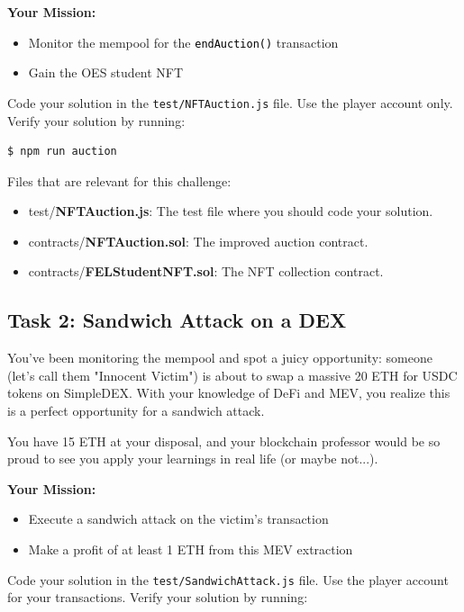 \documentclass[12pt]{article}
\newcommand{\codegrey}[1]{%
  \texttt{\colorbox{black!4}{\textcolor{black}{#1}}}%
}
\begin{document}
\medskip
\noindent
\textbf{Your Mission:}
\begin{itemize}
    \item Monitor the mempool for the \codegrey{endAuction()} transaction
    \item Gain the OES student NFT
\end{itemize}

\noindent
Code your solution in the \texttt{test/NFTAuction.js} file. Use the player account only. Verify your solution by running:

\begin{verbatim}
$ npm run auction
\end{verbatim}

\noindent
Files that are relevant for this challenge:
\begin{itemize}
\item test/\textbf{NFTAuction.js}: The test file where you should code your solution.
\item contracts/\textbf{NFTAuction.sol}: The improved auction contract.
\item contracts/\textbf{FELStudentNFT.sol}: The NFT collection contract.
\end{itemize}

\subsection*{Task 2: Sandwich Attack on a DEX}

You've been monitoring the mempool and spot a juicy opportunity: someone (let's call them "Innocent Victim") is about to swap a massive 20 ETH for USDC tokens on SimpleDEX. With your knowledge of DeFi and MEV, you realize this is a perfect opportunity for a sandwich attack.

You have 15 ETH at your disposal, and your blockchain professor would be so proud to see you apply your learnings in real life (or maybe not...).

\medskip
\noindent
\textbf{Your Mission:}
\begin{itemize}
  \item Execute a sandwich attack on the victim's transaction
  \item Make a profit of at least 1 ETH from this MEV extraction
\end{itemize}

\noindent
Code your solution in the \texttt{test/SandwichAttack.js} file. Use the player account for your transactions. Verify your solution by running:
\end{document}
